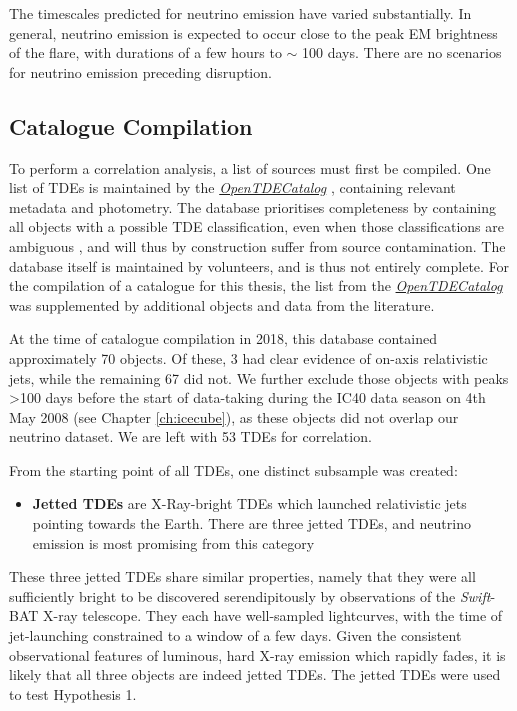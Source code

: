 The timescales predicted for neutrino emission have varied substantially. In general, neutrino emission is expected to occur close to the peak EM brightness of the flare, with durations of a few hours to $\sim$ 100 days. There are no scenarios for neutrino emission preceding disruption. 

\subsection{Catalogue Compilation}

To perform a correlation analysis, a list of sources must first be compiled. One list of TDEs is maintained by the \emph{\href{https://tde.space/}{OpenTDECatalog}} , containing relevant metadata and photometry. The database prioritises completeness by containing all objects with a possible TDE classification, even when those classifications are ambiguous \cite{tde_catalog_paper}, and will thus by construction suffer from source contamination. The database itself is maintained by volunteers, and is thus not entirely complete. For the compilation of a catalogue for this thesis, the list from the \emph{\href{https://tde.space/}{OpenTDECatalog}} was supplemented by additional objects and data from the literature.

At the time of catalogue compilation in 2018, this database contained approximately 70 objects. Of these, 3 had clear evidence of on-axis relativistic jets, while the remaining 67 did not. We further exclude those objects with peaks >100 days before the start of data-taking during the IC40 data season on 4th May 2008 (see Chapter \ref{ch:icecube}), as these objects did not overlap our neutrino dataset. We are left with 53 TDEs for correlation.

From the starting point of all TDEs, one distinct subsample was created:

\begin{itemize}
	\item \textbf{Jetted TDEs} are X-Ray-bright TDEs which launched relativistic jets pointing towards the Earth. There are three jetted TDEs, and neutrino emission is most promising from this category
\end{itemize}

These three jetted TDEs share similar properties, namely that they were all sufficiently bright to be discovered serendipitously by observations of the \textit{Swift}-BAT X-ray telescope. They each have well-sampled lightcurves, with the time of jet-launching constrained to a window of a few days. Given the consistent observational features of luminous, hard X-ray emission which rapidly fades, it is likely that all three objects are indeed jetted TDEs. The jetted TDEs were used to test Hypothesis 1.

